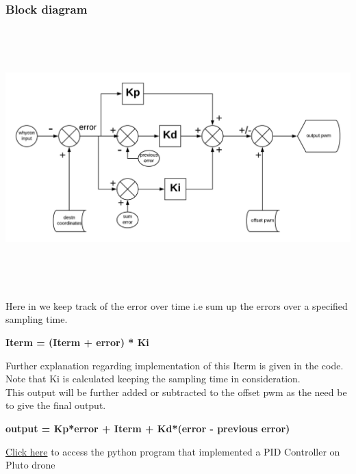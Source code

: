 \documentclass[a4paper,12pt,oneside]{book}
\begin{document}
\subsubsection{\textbf{Block diagram}}
\begin{flushleft}
\includegraphics[width = 15cm , height= 10cm]{PID-controller.png}
\end{flushleft}
Here in we keep track of the error over time i.e sum up the errors over a specified sampling time.\\
\begin{center}
   \textbf{ Iterm = (Iterm + error) * Ki}
\end{center}
Further explanation regarding implementation of this Iterm is given in the code.\\
Note that Ki  is calculated keeping the sampling time in consideration.\\
This output will be further  added or subtracted to the offset pwm as the need be to give the final output.
\begin{center}
    \textbf{output = Kp*error + Iterm + Kd*(error - previous error)}
\end{center}
\href{https://github.com/eYSIP-2018/Autotuning-of-Controller-For-Drone/blob/karthik/PID-controller.py}{Click here} to access the python program that implemented a PID Controller on Pluto drone\\
\end{document}
